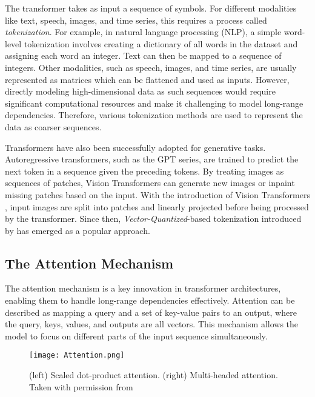 \documentclass[../../thesis.tex]{subfiles}
\begin{document}
The transformer takes as input a sequence of symbols. For different modalities like text, speech, images, and time series, this requires a process called \textit{tokenization}. For example, in natural language processing (NLP), a simple word-level tokenization involves creating a dictionary of all words in the dataset and assigning each word an integer. Text can then be mapped to a sequence of integers. Other modalities, such as speech, images, and time series, are usually represented as matrices which can be flattened and used as inputs. However, directly modeling high-dimensional data as such sequences would require significant computational resources and make it challenging to model long-range dependencies. Therefore, various tokenization methods are used to represent the data as coarser sequences. 
\newline

Transformers have also been successfully adopted for generative tasks. Autoregressive transformers, such as the GPT series, are trained to predict the next token in a sequence given the preceding tokens. By treating images as sequences of patches, Vision Transformers can generate new images or inpaint missing patches based on the input. With the introduction of Vision Transformers \cite{dosovitskiy2021image}, input images are split into patches and linearly projected before being processed by the transformer. Since then, \textit{Vector-Quantized}-based tokenization introduced by \cite{VQVAE} has emerged as a popular approach.

\subsection{The Attention Mechanism}

The attention mechanism is a key innovation in transformer architectures, enabling them to handle long-range dependencies effectively. Attention can be described as mapping a query and a set of key-value pairs to an output, where the query, keys, values, and outputs are all vectors. This mechanism allows the model to focus on different parts of the input sequence simultaneously.

\begin{figure}[h]
    \texttt{[image: Attention.png]}
    \centering 
    \caption{(left) Scaled dot-product attention. (right) Multi-headed attention. Taken with permission from \cite{vaswani2023attention}}
    \label{fig:attention}
\end{figure}
\end{document}
